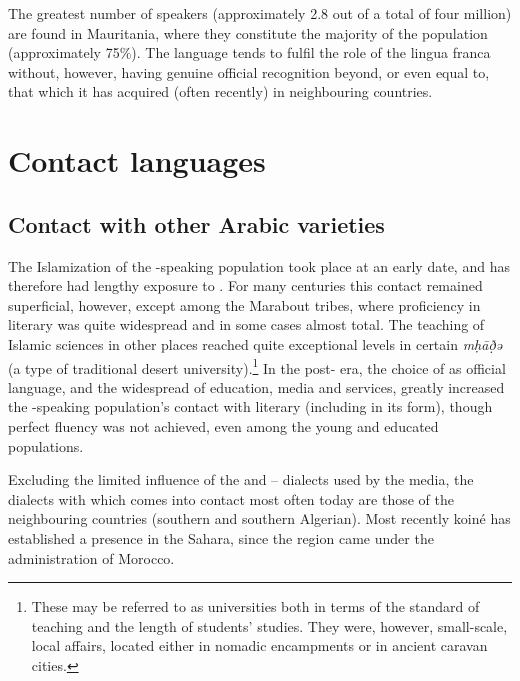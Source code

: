 \documentclass[output=paper]{langsci/langscibook}
\begin{document}
The greatest number of  speakers (approximately 2.8 out of a total of four million) are found in Mauritania, where they constitute the majority of the population (approximately 75\%). The  language tends to fulfil the role of the lingua franca without, however, having genuine official recognition beyond, or even equal to, that which it has acquired (often recently) in neighbouring countries.

\section{Contact languages} %

\subsection{Contact with other Arabic varieties} %

The Islamization of the -speaking population took place at an early date, and  has therefore had lengthy exposure to  . For many centuries this contact remained superficial, however, except among the Marabout tribes, where proficiency in literary  was quite widespread and in some cases almost total. The teaching of Islamic sciences in other places reached quite exceptional levels in certain \textit{mḥāð̣ə{\R}} (a type of traditional desert university).\footnote{These may be referred to as universities both in terms of the standard of teaching and the length of students’ studies. They were, however, small-scale, local affairs, located either in nomadic encampments or in ancient caravan cities.} In the post- era, the choice of  as official language, and the widespread  of education, media and services, greatly increased the -speaking population’s contact with literary  (including in its  form), though perfect fluency was not achieved, even among the young and educated populations. 

Excluding the limited influence of the  and – dialects used by the media, the  dialects with which  comes into contact most often today are those of the neighbouring countries (southern  and southern Algerian). Most recently  koiné  has established a presence in the  Sahara, since the region came under the administration of Morocco.
\end{document}
